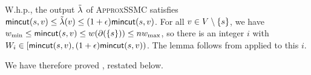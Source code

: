 \BL
W.h.p., the output $\tilde{\lambda}$ of \textsc{ApproxSSMC} satisfies $\textsf{\textup{mincut}}(s,v) \le \tilde{\lambda}(v) \le (1+\epsilon)\textsf{\textup{mincut}}(s,v)$.
\EL
\BP
For all $v\in V\setminus\{s\}$, we have $w_{\min}\le\textsf{\textup{mincut}}(s,v)\le w(\partial(\{s\}))\le nw_{\max}$, so there is an integer $i$ with $ W_i\in[\textsf{\textup{mincut}}(s,v),(1+\epsilon)\textsf{\textup{mincut}}(s,v))$. The lemma follows from  applied to this $i$.
\EP

We have therefore proved , restated below.
\SSMC*

